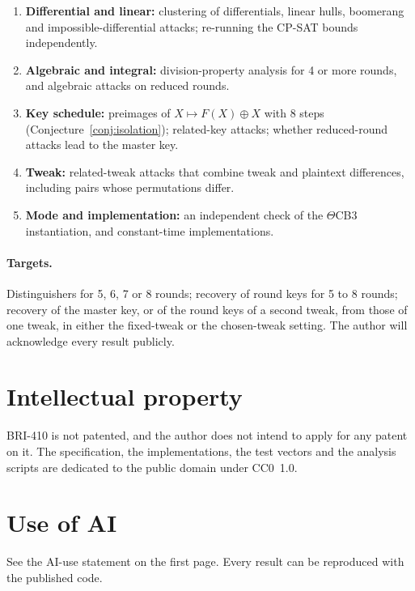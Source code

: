 \documentclass[11pt,a4paper]{article}
\begin{document}
\begin{enumerate}
\item \textbf{Differential and linear:} clustering of differentials, linear hulls, boomerang and
  impossible-differential attacks; re-running the CP-SAT bounds independently.
\item \textbf{Algebraic and integral:} division-property analysis for 4 or more rounds, and algebraic attacks on
  reduced rounds.
\item \textbf{Key schedule:} preimages of $X \mapsto F(X) \oplus X$ with 8 steps (Conjecture~\ref{conj:isolation});
  related-key attacks; whether reduced-round attacks lead to the master key.
\item \textbf{Tweak:} related-tweak attacks that combine tweak and plaintext differences, including pairs whose
  permutations differ.
\item \textbf{Mode and implementation:} an independent check of the $\Theta$CB3 instantiation, and constant-time
  implementations.
\end{enumerate}

\paragraph{Targets.} Distinguishers for 5, 6, 7 or 8 rounds; recovery of round keys for 5 to 8 rounds; recovery of
the master key, or of the round keys of a second tweak, from those of one tweak, in either the fixed-tweak or the
chosen-tweak setting. The author will acknowledge every result publicly.

\section*{Intellectual property}

BRI-410 is not patented, and the author does not intend to apply for any patent on it. The specification, the
implementations, the test vectors and the analysis scripts are dedicated to the public domain under CC0~1.0.

\section*{Use of AI}

See the AI-use statement on the first page. Every result can be reproduced with the published code.
\end{document}
